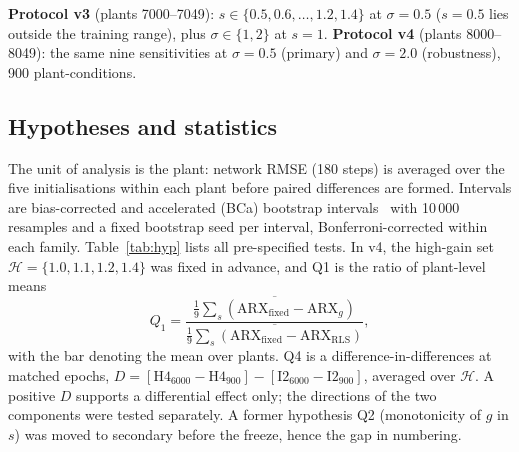 \documentclass[11pt]{article}
\begin{document}
\textbf{Protocol v3} (plants 7000--7049): $s\in\{0.5,0.6,\dots,1.2,1.4\}$ at $\sigma=0.5$ ($s=0.5$ lies outside the training range), plus $\sigma\in\{1,2\}$ at $s=1$. \textbf{Protocol v4} (plants 8000--8049): the same nine sensitivities at $\sigma=0.5$ (primary) and $\sigma=2.0$ (robustness), 900 plant-conditions.

\subsection{Hypotheses and statistics}
The unit of analysis is the plant: network RMSE (180 steps) is averaged over the five initialisations within each plant before paired differences are formed. Intervals are bias-corrected and accelerated (BCa) bootstrap intervals~\cite{efron1987} with 10\,000 resamples and a fixed bootstrap seed per interval, Bonferroni-corrected within each family. Table~\ref{tab:hyp} lists all pre-specified tests. In v4, the high-gain set $\mathcal H=\{1.0,1.1,1.2,1.4\}$ was fixed in advance, and Q1 is the ratio of plant-level means
\begin{equation}
Q_1=\frac{\overline{\textstyle\frac19\sum_s(\mathrm{ARX}_{\mathrm{fixed}}-\mathrm{ARX}_g)}}{\overline{\textstyle\frac19\sum_s(\mathrm{ARX}_{\mathrm{fixed}}-\mathrm{ARX}_{\mathrm{RLS}})}},
\end{equation}
with the bar denoting the mean over plants. Q4 is a difference-in-differences at matched epochs, $D=[\text{H4}_{6000}-\text{H4}_{900}]-[\text{I2}_{6000}-\text{I2}_{900}]$, averaged over $\mathcal H$. A positive $D$ supports a differential effect only; the directions of the two components were tested separately. A former hypothesis Q2 (monotonicity of $g$ in $s$) was moved to secondary before the freeze, hence the gap in numbering.
\end{document}

